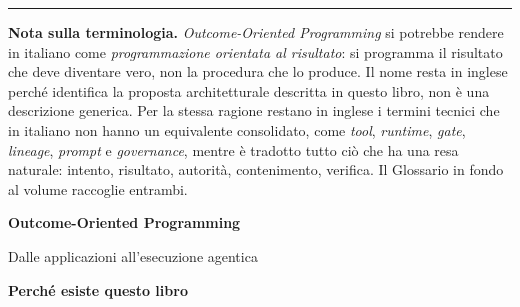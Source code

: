 \documentclass[10pt,oneside,openany]{book}
\begin{document}
\begin{center}
\begin{minipage}{0.84\linewidth}
\hrule\vspace{7pt}
{\small{}
\textbf{\sffamily Nota sulla terminologia.} \emph{Outcome-Oriented Programming} si potrebbe rendere in italiano come \emph{programmazione orientata al risultato}: si programma il risultato che deve diventare vero, non la procedura che lo produce. Il nome resta in inglese perché identifica la proposta architetturale descritta in questo libro, non è una descrizione generica. Per la stessa ragione restano in inglese i termini tecnici che in italiano non hanno un equivalente consolidato, come \emph{tool}, \emph{runtime}, \emph{gate}, \emph{lineage}, \emph{prompt} e \emph{governance}, mentre è tradotto tutto ciò che ha una resa naturale: intento, risultato, autorità, contenimento, verifica. Il Glossario in fondo al volume raccoglie entrambi.
\par}
\end{minipage}
\end{center}
\vspace*{0.9in}
\clearpage

\pagestyle{empty}
\vspace*{0.01in}
{\sffamily\bfseries\LARGE Outcome-Oriented Programming\par}
\vspace{0.05in}
{\sffamily\large Dalle applicazioni all'esecuzione agentica\par}
\vspace{0.14in}

{\sffamily\bfseries\Large Perché esiste questo libro\par}
\vspace{0.06in}
\end{document}
